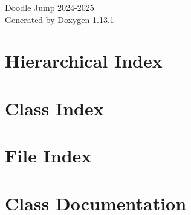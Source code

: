 \documentclass[twoside]{book}
\newcommand{\+}{\discretionary{\mbox{\scriptsize$\hookleftarrow$}}{}{}}
\newcommand{\clearemptydoublepage}{%
    \newpage{\pagestyle{empty}\cleardoublepage}%
  }
\begin{document}
  \raggedbottom
    \hypersetup{pageanchor=false,
                bookmarksnumbered=true,
                pdfencoding=unicode
               }
  \begin{titlepage}
  \vspace*{7cm}
  \begin{center}%
  {\Large Doodle Jump 2024-\/2025}\\
  \vspace*{1cm}
  {\large Generated by Doxygen 1.13.1}\\
  \end{center}
  \end{titlepage}
  \clearemptydoublepage
  \tableofcontents
  \clearemptydoublepage
  \hypersetup{pageanchor=true}
\chapter{Hierarchical Index}

\chapter{Class Index}

\chapter{File Index}

\chapter{Class Documentation}
































\end{document}
